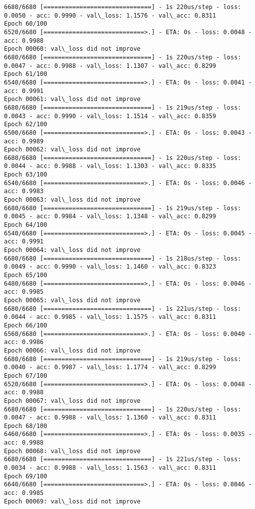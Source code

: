 \documentclass[11pt]{article}
\begin{document}
\begin{Verbatim}[commandchars=\\\{\}]
6680/6680 [==============================] - 1s 220us/step - loss: 0.0050 - acc: 0.9990 - val\_loss: 1.1576 - val\_acc: 0.8311
Epoch 60/100
6520/6680 [============================>.] - ETA: 0s - loss: 0.0048 - acc: 0.9988
Epoch 00060: val\_loss did not improve
6680/6680 [==============================] - 1s 220us/step - loss: 0.0047 - acc: 0.9988 - val\_loss: 1.1307 - val\_acc: 0.8299
Epoch 61/100
6540/6680 [============================>.] - ETA: 0s - loss: 0.0041 - acc: 0.9991
Epoch 00061: val\_loss did not improve
6680/6680 [==============================] - 1s 219us/step - loss: 0.0043 - acc: 0.9990 - val\_loss: 1.1514 - val\_acc: 0.8359
Epoch 62/100
6500/6680 [============================>.] - ETA: 0s - loss: 0.0043 - acc: 0.9989
Epoch 00062: val\_loss did not improve
6680/6680 [==============================] - 1s 220us/step - loss: 0.0044 - acc: 0.9988 - val\_loss: 1.1303 - val\_acc: 0.8335
Epoch 63/100
6540/6680 [============================>.] - ETA: 0s - loss: 0.0046 - acc: 0.9983
Epoch 00063: val\_loss did not improve
6680/6680 [==============================] - 1s 219us/step - loss: 0.0045 - acc: 0.9984 - val\_loss: 1.1348 - val\_acc: 0.8299
Epoch 64/100
6540/6680 [============================>.] - ETA: 0s - loss: 0.0045 - acc: 0.9991
Epoch 00064: val\_loss did not improve
6680/6680 [==============================] - 1s 218us/step - loss: 0.0049 - acc: 0.9990 - val\_loss: 1.1460 - val\_acc: 0.8323
Epoch 65/100
6480/6680 [============================>.] - ETA: 0s - loss: 0.0046 - acc: 0.9985
Epoch 00065: val\_loss did not improve
6680/6680 [==============================] - 1s 221us/step - loss: 0.0044 - acc: 0.9985 - val\_loss: 1.1575 - val\_acc: 0.8311
Epoch 66/100
6560/6680 [============================>.] - ETA: 0s - loss: 0.0040 - acc: 0.9986
Epoch 00066: val\_loss did not improve
6680/6680 [==============================] - 1s 219us/step - loss: 0.0040 - acc: 0.9987 - val\_loss: 1.1774 - val\_acc: 0.8299
Epoch 67/100
6520/6680 [============================>.] - ETA: 0s - loss: 0.0048 - acc: 0.9988
Epoch 00067: val\_loss did not improve
6680/6680 [==============================] - 1s 220us/step - loss: 0.0047 - acc: 0.9988 - val\_loss: 1.1360 - val\_acc: 0.8311
Epoch 68/100
6460/6680 [============================>.] - ETA: 0s - loss: 0.0035 - acc: 0.9988
Epoch 00068: val\_loss did not improve
6680/6680 [==============================] - 1s 221us/step - loss: 0.0034 - acc: 0.9988 - val\_loss: 1.1563 - val\_acc: 0.8311
Epoch 69/100
6640/6680 [============================>.] - ETA: 0s - loss: 0.0046 - acc: 0.9985
Epoch 00069: val\_loss did not improve

\end{Verbatim}
\end{document}
